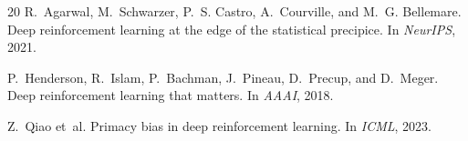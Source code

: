 \documentclass[10pt,letterpaper]{article}
\begin{document}
\begin{thebibliography}{20}
R.~Agarwal, M.~Schwarzer, P.~S. Castro, A.~Courville, and M.~G. Bellemare.
\newblock Deep reinforcement learning at the edge of the statistical precipice.
\newblock In \emph{NeurIPS}, 2021.

P.~Henderson, R.~Islam, P.~Bachman, J.~Pineau, D.~Precup, and D.~Meger.
\newblock Deep reinforcement learning that matters.
\newblock In \emph{AAAI}, 2018.

Z.~Qiao et~al.
\newblock Primacy bias in deep reinforcement learning.
\newblock In \emph{ICML}, 2023.

\end{thebibliography}
\end{document}
